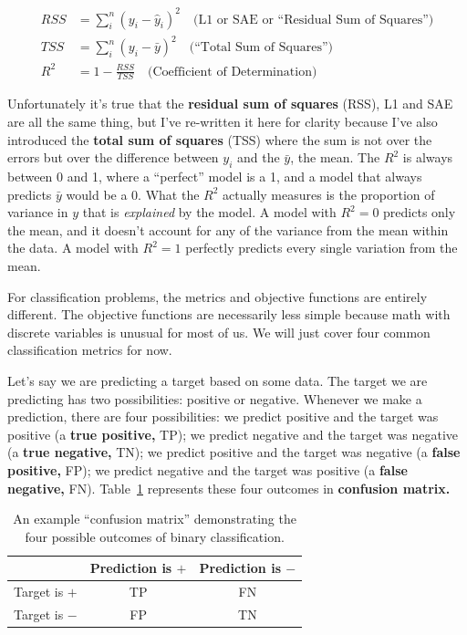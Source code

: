 \begin{align}
    RSS &= \sum_i^n (y_i - \hat{y}_i)^2 \quad \text{(L1 or SAE or ``Residual Sum of Squares'')} \\
    TSS &= \sum_i^n (y_i - \bar{y})^2 \quad \text{(``Total Sum of Squares'')} \\
    R^2 &= 1 - \frac{RSS}{TSS} \quad \text{(Coefficient of Determination)}
\end{align}

Unfortunately it's true that the \textbf{residual sum of squares} (RSS), L1 and SAE are all the same thing, but I've re-written it here for clarity because I've also introduced the \textbf{total sum of squares} (TSS) where the sum is not over the errors but over the difference between $y_i$ and the $\bar{y}$, the mean. The $R^2$ is always between 0 and 1, where a ``perfect'' model is a 1, and a model that always predicts $\bar{y}$ would be a 0. What the $R^2$ actually measures is the proportion of variance in $y$ that is \textit{explained} by the model. A model with $R^2=0$ predicts only the mean, and it doesn't account for any of the variance from the mean within the data. A model with $R^2=1$ perfectly predicts every single variation from the mean.

For classification problems, the metrics and objective functions are entirely different. The objective functions are necessarily less simple because math with discrete variables is unusual for most of us. We will just cover four common classification metrics for now.

Let's say we are predicting a target based on some data. The target we are predicting has two possibilities: positive or negative. Whenever we make a prediction, there are four possibilities: we predict positive and the target was positive (a \textbf{true positive,} TP); we predict negative and the target was negative (a \textbf{true negative,} TN); we predict positive and the target was negative (a \textbf{false positive,} FP); we predict negative and the target was positive (a \textbf{false negative,} FN). Table~\ref{tab:confusion_table} represents these four outcomes in \textbf{confusion matrix.}

\begin{table}
    \centering
    \begin{tabular}{c|c|c}
                      & Prediction is $+$ & Prediction is $-$ \\ \hline
        Target is $+$ & TP               & FN \\ \hline
        Target is $-$ & FP               & TN \\
    \end{tabular}
    \caption{An example ``confusion matrix'' demonstrating the four possible outcomes of binary classification.}
    \label{tab:confusion_table}
\end{table}

